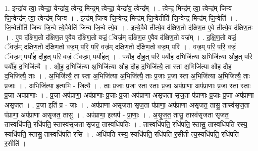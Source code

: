 \documentclass[17pt]{extarticle}
\begin{document}
1. इन्द्रा॑य त्वा॒ त्वेन्द्रा॒ येन्द्रा॑य॒ त्वेन्द्र॒ मिन्द्र॒म् त्वेन्द्रा॒ येन्द्रा॑य॒ त्वेन्द्र᳚म् । . त्वेन्द्र॒ मिन्द्र॑म् त्वा॒ त्वेन्द्र॑म् जिन्व जि॒न्वेन्द्र॑म् त्वा॒ त्वेन्द्र॑म् जिन्व । . इन्द्र॑म् जिन्व जि॒न्वेन्द्र॒ मिन्द्र॑म् जि॒न्वेतीति॑ जि॒न्वेन्द्र॒ मिन्द्र॑म् जि॒न्वेति॑ । . जि॒न्वेतीति॑ जिन्व जि॒न्वे त्ये॒वैवेति॑ जिन्व जि॒न्वे त्ये॒व । . इत्ये॒वैवे तीत्ये॒व द॑क्षिण॒तो द॑क्षिण॒त ए॒वे तीत्ये॒व द॑क्षिण॒तः । . ए॒व द॑क्षिण॒तो द॑क्षिण॒त ए॒वैव द॑क्षिण॒तो वज्रं॒ ॅवज्र॑म् दक्षिण॒त ए॒वैव द॑क्षिण॒तो वज्र᳚म् । . द॒क्षि॒ण॒तो वज्रं॒ ॅवज्र॑म् दक्षिण॒तो द॑क्षिण॒तो वज्र॒म् परि॒ परि॒ वज्र॑म् दक्षिण॒तो द॑क्षिण॒तो वज्र॒म् परि॑ । . वज्र॒म् परि॒ परि॒ वज्रं॒ ॅवज्र॒म् पर्यौ॑ह दौह॒त् परि॒ वज्रं॒ ॅवज्र॒म् पर्यौ॑हत् । . पर्यौ॑ह दौह॒त् परि॒ पर्यौ॑ह द॒भिजि॑त्या अ॒भिजि॑त्या औह॒त् परि॒ पर्यौ॑ह द॒भिजि॑त्यै । . औ॒ह॒ द॒भिजि॑त्या अ॒भिजि॑त्या औह दौह द॒भिजि॑त्यै॒ ता स्ता अ॒भिजि॑त्या औह दौह द॒भिजि॑त्यै॒ ताः । . अ॒भिजि॑त्यै॒ ता स्ता अ॒भिजि॑त्या अ॒भिजि॑त्यै॒ ताः प्र॒जाः प्र॒जा स्ता अ॒भिजि॑त्या अ॒भिजि॑त्यै॒ ताः प्र॒जाः । . अ॒भिजि॑त्या॒ इत्य॒भि - जि॒त्यै॒ । . ताः प्र॒जाः प्र॒जा स्ता स्ताः प्र॒जा अप॑प्राणा॒ अप॑प्राणाः प्र॒जा स्ता स्ताः प्र॒जा अप॑प्राणाः । . प्र॒जा अप॑प्राणा॒ अप॑प्राणाः प्र॒जाः प्र॒जा अप॑प्राणा असृजता सृज॒ता प॑प्राणाः प्र॒जाः प्र॒जा अप॑प्राणा असृजत । . प्र॒जा इति॑ प्र - जाः । . अप॑प्राणा असृजता सृज॒ता प॑प्राणा॒ अप॑प्राणा असृजत॒ तासु॒ तास्व॑सृज॒ता प॑प्राणा॒ अप॑प्राणा असृजत॒ तासु॑ । . अप॑प्राणा॒ इत्यप॑ - प्रा॒णाः॒ । . अ॒सृ॒ज॒त॒ तासु॒ तास्व॑सृजता सृजत॒ तास्वधि॑पति॒ रधि॑पति॒ स्तास्व॑सृजता सृजत॒ तास्वधि॑पतिः । . तास्वधि॑पति॒ रधि॑पति॒ स्तासु॒ तास्वधि॑पति रस्य॒ स्यधि॑पति॒ स्तासु॒ तास्वधि॑पति रसि । . अधि॑पति रस्य॒ स्यधि॑पति॒ रधि॑पति र॒सीती त्य॒स्यधि॑पति॒ रधि॑पति र॒सीति॑ । \newline
\end{document}
